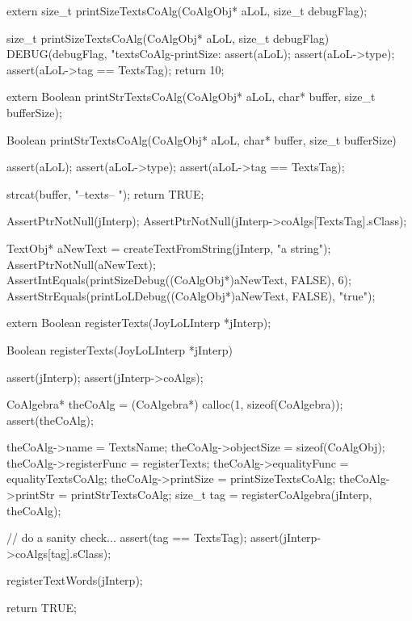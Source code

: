 \startCHeader
extern size_t printSizeTextsCoAlg(CoAlgObj* aLoL, size_t debugFlag);
\stopCHeader

\startCCode
size_t printSizeTextsCoAlg(CoAlgObj* aLoL, size_t debugFlag) {
  DEBUG(debugFlag, "textsCoAlg-printSize: %
  assert(aLoL);
  assert(aLoL->type);
  assert(aLoL->tag == TextsTag);
  return 10;
}
\stopCCode

\startCHeader
extern Boolean printStrTextsCoAlg(CoAlgObj* aLoL,
                                 char* buffer, size_t bufferSize);
\stopCHeader

\startCCode
Boolean printStrTextsCoAlg(CoAlgObj* aLoL,
                          char* buffer, size_t bufferSize) {
  assert(aLoL);
  assert(aLoL->type);
  assert(aLoL->tag == TextsTag);

  strcat(buffer, "--texts-- ");
  return TRUE;
}
\stopCCode


\startCTest
  AssertPtrNotNull(jInterp);
  AssertPtrNotNull(jInterp->coAlgs[TextsTag].sClass);

  TextObj* aNewText = createTextFromString(jInterp, "a string");
  AssertPtrNotNull(aNewText);
  AssertIntEquals(printSizeDebug((CoAlgObj*)aNewText, FALSE), 6);
  AssertStrEquals(printLoLDebug((CoAlgObj*)aNewText, FALSE), "true");
\stopCTest
\stopTestCase
\stopTestSuite

\startTestSuite[registerTexts]

\startCHeader
extern Boolean registerTexts(JoyLoLInterp *jInterp);
\stopCHeader

\startCCode
Boolean registerTexts(JoyLoLInterp *jInterp) {
  assert(jInterp);
  assert(jInterp->coAlgs);
  
  CoAlgebra* theCoAlg    = (CoAlgebra*) calloc(1, sizeof(CoAlgebra));
  assert(theCoAlg);
  
  theCoAlg->name         = TextsName;
  theCoAlg->objectSize   = sizeof(CoAlgObj);
  theCoAlg->registerFunc = registerTexts;
  theCoAlg->equalityFunc = equalityTextsCoAlg;
  theCoAlg->printSize    = printSizeTextsCoAlg;
  theCoAlg->printStr     = printStrTextsCoAlg;
  size_t tag = registerCoAlgebra(jInterp, theCoAlg);
  
  // do a sanity check...
  assert(tag == TextsTag);
  assert(jInterp->coAlgs[tag].sClass);
  
  registerTextWords(jInterp);
  
  return TRUE;
}
\stopCCode


